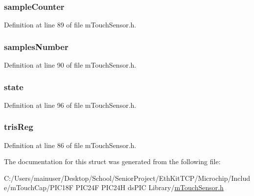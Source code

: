 \subsubsection[{sample\+Counter}]{ sample\+Counter}\label{structtag___s_e_n_s_o_r_ab7199a7464c41f1083fe9a4151ae747f}


Definition at line 89 of file m\+Touch\+Sensor.\+h.

\hypertarget{structtag___s_e_n_s_o_r_a47236f1a24dd4979c5acc271a5767f0f}{}
\subsubsection[{samples\+Number}]{ samples\+Number}\label{structtag___s_e_n_s_o_r_a47236f1a24dd4979c5acc271a5767f0f}


Definition at line 90 of file m\+Touch\+Sensor.\+h.

\hypertarget{structtag___s_e_n_s_o_r_a6e9c4cbd32a1178b12f3a61f6855c896}{}
\subsubsection[{state}]{ state}\label{structtag___s_e_n_s_o_r_a6e9c4cbd32a1178b12f3a61f6855c896}


Definition at line 96 of file m\+Touch\+Sensor.\+h.

\hypertarget{structtag___s_e_n_s_o_r_a13fff288431a67c8210c3af93b302cac}{}
\subsubsection[{tris\+Reg}]{ tris\+Reg}\label{structtag___s_e_n_s_o_r_a13fff288431a67c8210c3af93b302cac}


Definition at line 86 of file m\+Touch\+Sensor.\+h.



The documentation for this struct was generated from the following file\+:\begin{DoxyCompactItemize}
\item 
C\+:/\+Users/mainuser/\+Desktop/\+School/\+Senior\+Project/\+Eth\+Kit\+T\+C\+P/\+Microchip/\+Include/m\+Touch\+Cap/\+P\+I\+C18\+F P\+I\+C24\+F P\+I\+C24\+H ds\+P\+I\+C Library/\hyperlink{m_touch_sensor_8h}{m\+Touch\+Sensor.\+h}\end{DoxyCompactItemize}
